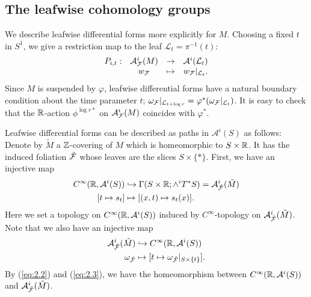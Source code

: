 \subsection{The leafwise cohomology groups}

We describe leafwise differential forms more explicitly for $M$.
Choosing a fixed $t$ in $S^{1}$, we give a restriction map to the leaf  $\mathcal{L}_{t}=\pi^{-1}(t)$:
\begin{equation*}
\begin{matrix}
P_{i,t} : &\mathcal{A}^{i}_{{\mathcal{F}}}(M) &\rightarrow &\mathcal{A}^{i}(\mathcal{L}_{t})\\ &w_{{\mathcal{F}}} &\mapsto &w_{{\mathcal{F}}}|_{\mathcal{L}_{t}}.
\end{matrix}
\end{equation*}
Since $M$ is suspended by $\varphi$, leafwise differential forms have a natural boundary condition about the time parameter $t$; $\omega_{{\mathcal{F}}}|_{\mathcal{L}_{t+\log{r}}} = \varphi^{*}(\omega_{{\mathcal{F}}}|_{\mathcal{L}_{t}})$. 
It is easy to check that the ${\mathbb{R}}$-action $\phi^{\log{r} *}$ on $\mathcal{A}^{i}_{{\mathcal{F}}}(M)$ coincides with $\varphi^{*}$.


Leafwise differential forms can be described as paths in $\mathcal{A}^{i}(S)$ as follows: Denote by $\tilde{M}$ a ${\mathbb{Z}}$-covering of $M$ which is homeomorphic to $S\times{\mathbb{R}}$. 
It has the induced foliation $\tilde{{\mathcal{F}}}$ whose leaves are the slices $S\times \{ * \}$.
First, we have an injective map
\begin{equation}\label{eq:2.2}
    \begin{split}
        C^{\infty}({\mathbb{R}},\mathcal{A}^{i}(S)) &\hookrightarrow {\Gamma(S\times{\mathbb{R}};\wedge^{i}T^{*}S)}=\mathcal{A}_{\tilde{{\mathcal{F}}}}^{i}(\tilde{M})\\
        [t\mapsto{s_{t}}] &\mapsto [(x,t)\mapsto{s_{t}(x)}].
    \end{split}
\end{equation}
Here we set a topology on $C^{\infty}({\mathbb{R}},\mathcal{A}^{i}(S))$ induced by $C^{\infty}$-topology on $\mathcal{A}_{\tilde{{\mathcal{F}}}}^{i}(\tilde{M})$.
Note that we also have an injective map
\begin{equation}\label{eq:2.3}
    \begin{split}
        \mathcal{A}_{\tilde{{\mathcal{F}}}}^{i}(\tilde{M})&\hookrightarrow{C}^{\infty}({\mathbb{R}},\mathcal{A}^{i}(S))\\
        \omega_{\tilde{{\mathcal{F}}}}&\mapsto{[t\mapsto{\omega_{\tilde{{\mathcal{F}}}}|_{S\times\left\{t\right\} }}]}.
    \end{split}
\end{equation}
By (\ref{eq:2.2}) and (\ref{eq:2.3}), we have the homeomorphism between $C^{\infty}({\mathbb{R}},\mathcal{A}^{i}(S))$ and $\mathcal{A}_{\tilde{{\mathcal{F}}}}^{i}(\tilde{M})$.

